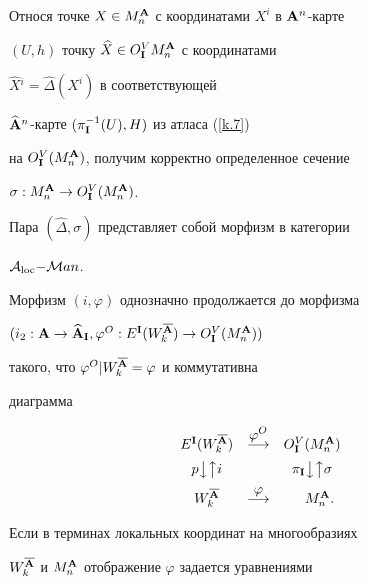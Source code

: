  


\begin{pf}


Относя точке $X\in M^{\bold A}_n$ с координатами $X^i$ в ${\bold A}^n$-карте


$(U,h)$ точку $\widehat X\in O^V_{{\bold I}}M^{\bold A}_n$ с координатами


$\widehat X{}^i=\widehat\Delta(X^i)$ в соответствующей


$\widehat{{\bold A}}^n$-карте $(\pi_{{\bold I}}^{-1}(U),H)$ из атласа (\ref{k.7})


на $O^V_{{\bold I}}(M^{\bold A}_n)$, получим корректно определенное сечение


$\sigma:M^{\bold A}_n\to O^V_{{\bold I}}(M^{\bold A}_n)$.


Пара $(\widehat\Delta,\sigma)$ представляет собой морфизм в категории


${\cal A}_{\operatorname{loc}}{-}{\cal M}an$.


 


Морфизм $(i,\varphi)$ однозначно продолжается до морфизма


$(i_2:\A\to\widehat\A_\I, \varphi^O:E^\I(W^{\overline\A}_k)\to


O^V_\I(M^\A_n))$


такого, что $\varphi^O|W^{\overline{{\bold A}}}_k=\varphi$ и коммутативна


диаграмма


\begin{equation}


\begin{array}{ccc}


E^\I(W^{\overline\A}_k) & \overset{\displaystyle \varphi^O}{\longrightarrow}


& O^V_\I(M^\A_n) \\[2mm]


p\big\downarrow\big\uparrow i &&


\pi_\I\big\downarrow\big\uparrow\sigma \\[2mm]


W^{\overline\A}_k& \overset{\displaystyle \varphi}{\longrightarrow} &


{\phantom {aa}}M^\A_n.


\end{array}


\label{l.7}


\end{equation}


Если в терминах локальных координат на многообразиях


$W^{\overline{{\bold A}}}_k$ и $M^{\bold A}_n$ отображение $\varphi$ задается уравнениями



\end{pf}
